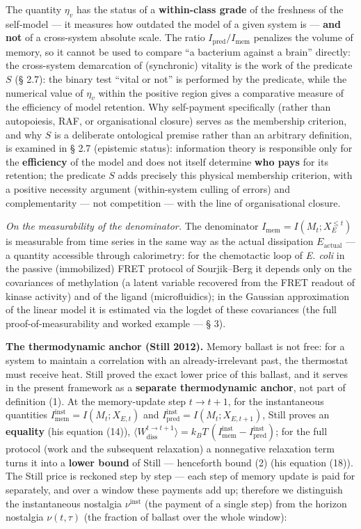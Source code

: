 \documentclass[pdflatex,sn-mathphys-ay]{sn-jnl}
\begin{document}
The quantity \(\eta_v\) has the status of a \textbf{within-class grade} of the freshness of the self-model --- it measures how outdated the model of a given system is --- \textbf{and not} of a cross-system absolute scale. The ratio \(I_{\text{pred}}/I_{\text{mem}}\) penalizes the volume of memory, so it cannot be used to compare ``a bacterium against a brain'' directly: the cross-system demarcation of (synchronic) vitality is the work of the predicate \(S\) (§ 2.7): the binary test ``vital or not'' is performed by the predicate, while the numerical value of \(\eta_v\) within the positive region gives a comparative measure of the efficiency of model retention. Why self-payment specifically (rather than autopoiesis, RAF, or organisational closure) serves as the membership criterion, and why \(S\) is a deliberate ontological premise rather than an arbitrary definition, is examined in § 2.7 (epistemic status): information theory is responsible only for the \textbf{efficiency} of the model and does not itself determine \textbf{who pays} for its retention; the predicate \(S\) adds precisely this physical membership criterion, with a positive necessity argument (within-system culling of errors) and complementarity --- not competition --- with the line of organisational closure.

\emph{On the measurability of the denominator.} The denominator \(I_{\text{mem}} = I(M_t; X_E^{\le t})\) is measurable from time series in the same way as the actual dissipation \(E_{\text{actual}}\) --- a quantity accessible through calorimetry: for the chemotactic loop of \emph{E. coli} in the passive (immobilized) FRET protocol of Sourjik--Berg it depends only on the covariances of methylation (a latent variable recovered from the FRET readout of kinase activity) and of the ligand (microfluidics); in the Gaussian approximation of the linear model it is estimated via the logdet of these covariances (the full proof-of-measurability and worked example --- § 3).

\textbf{The thermodynamic anchor (Still 2012).} Memory ballast is not free: for a system to maintain a correlation with an already-irrelevant past, the thermostat must receive heat. Still proved the exact lower price of this ballast, and it serves in the present framework as a \textbf{separate thermodynamic anchor}, not part of definition (1). At the memory-update step \(t \to t+1\), for the instantaneous quantities \(I_{\text{mem}}^{\text{inst}} = I(M_t; X_{E,t})\) and \(I_{\text{pred}}^{\text{inst}} = I(M_t; X_{E,t+1})\), Still proves an \textbf{equality} (his equation (14)), \(\langle W_{\text{diss}}^{t\to t+1}\rangle = k_B T\,(I_{\text{mem}}^{\text{inst}} - I_{\text{pred}}^{\text{inst}})\); for the full protocol (work and the subsequent relaxation) a nonnegative relaxation term turns it into a \textbf{lower bound} of Still --- henceforth bound (2) (his equation (18)). The Still price is reckoned step by step --- each step of memory update is paid for separately, and over a window these payments add up; therefore we distinguish the instantaneous nostalgia \(\nu^{\text{inst}}\) (the payment of a single step) from the horizon nostalgia \(\nu(t,\tau)\) (the fraction of ballast over the whole window):
\end{document}
